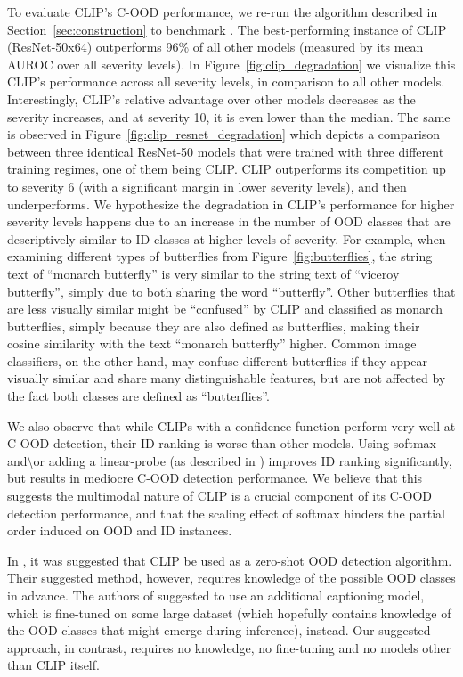 \documentclass[table]{article} \usepackage{PRIMEarxiv}
\begin{document}
To evaluate CLIP's C-OOD performance, we re-run the algorithm described in Section~\ref{sec:construction} to benchmark . The best-performing instance of CLIP (ResNet-50x64) outperforms 96\% of all other models (measured by its mean AUROC over all severity levels). 
In Figure~\ref{fig:clip_degradation} we visualize this CLIP's performance across all severity levels, in comparison to all other models. Interestingly, CLIP's relative advantage over other models decreases as the severity increases, and at severity 10, it is even lower than the median. 
The same is observed in Figure~\ref{fig:clip_resnet_degradation} which depicts a comparison between three identical ResNet-50 models that were trained with three different training regimes, one of them being CLIP. CLIP outperforms its competition up to severity 6 (with a significant margin in lower severity levels), and then underperforms.
We hypothesize the degradation in CLIP's performance for higher severity levels happens due to an increase in the number of OOD classes that are descriptively similar to ID classes at higher levels of severity. 
For example, when examining different types of butterflies from Figure~\ref{fig:butterflies}, the string text of ``monarch butterfly'' is very similar to the string text of ``viceroy butterfly'', simply due to both sharing the word ``butterfly''. Other butterflies that are less visually similar might be ``confused'' by CLIP and classified as monarch butterflies, simply because they are also defined as butterflies, making their cosine similarity with the text ``monarch butterfly'' higher. Common image classifiers, on the other hand, may confuse different butterflies if they appear visually similar and share many distinguishable features, but are not affected by the fact both classes are defined as ``butterflies''.


We also observe that while CLIPs with a confidence function  perform very well at C-OOD detection, their ID ranking is worse than other models. Using softmax and\textbackslash or adding a linear-probe (as described in \citet{DBLP:conf/icml/RadfordKHRGASAM21}) improves ID ranking significantly, but results in mediocre C-OOD detection performance.
We believe that this suggests the multimodal nature of CLIP is a crucial component of its C-OOD detection performance, and that the scaling effect of softmax hinders the partial order induced on OOD and ID instances.

In \citet{DBLP:conf/nips/FortRL21}, it was suggested that CLIP be used as a zero-shot OOD detection algorithm. Their suggested method, however, requires knowledge of the possible OOD classes in advance. The authors of \citet{DBLP:conf/aaai/Esmaeilpour00022} suggested to use an additional captioning model, which is fine-tuned on some large dataset (which hopefully contains knowledge of the OOD classes that might emerge during inference), instead. Our suggested approach, in contrast, requires no knowledge, no fine-tuning and no models other than CLIP itself.
\end{document}

